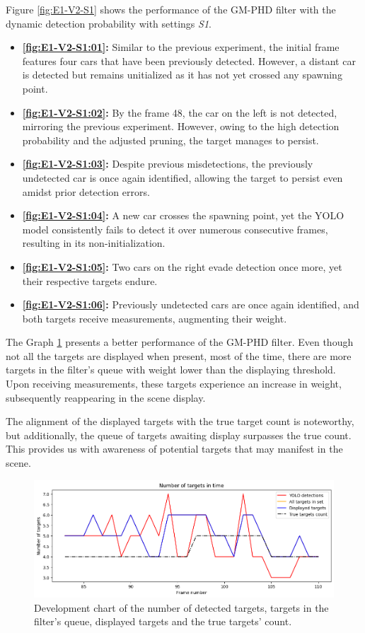 Figure \ref{fig:E1-V2-S1} shows the performance of the GM-PHD filter with the dynamic detection probability with settings \textit{S1}.
\begin{itemize}
    \item \textbf{\ref{fig:E1-V2-S1:01}:} Similar to the previous experiment, the initial frame features four cars
    that have been previously detected. However, a distant car is detected but remains unitialized as it has not yet
    crossed any spawning point.
    \item \textbf{\ref{fig:E1-V2-S1:02}:} By the frame 48, the car on the left is not detected, mirroring the
    previous experiment. However, owing to the high detection probability and the adjusted pruning, the target manages
    to persist.
    \item \textbf{\ref{fig:E1-V2-S1:03}:} Despite previous misdetections, the previously undetected car is once again identified, allowing the target to persist even amidst prior detection errors.
    \item \textbf{\ref{fig:E1-V2-S1:04}:} A new car crosses the spawning point, yet the YOLO model consistently fails to detect it over numerous consecutive frames, resulting in its non-initialization.
    \item \textbf{\ref{fig:E1-V2-S1:05}:} Two cars on the right evade detection once more, yet their respective targets endure.
    \item \textbf{\ref{fig:E1-V2-S1:06}:} Previously undetected cars are once again identified, and both targets receive measurements, augmenting their weight.
\end{itemize}

The Graph \ref{gr:E1-V2-S1} presents a better performance of the GM-PHD filter. Even though not all the targets are
displayed when present, most of the time, there are more targets in the filter's queue with weight lower than the
displaying threshold.
Upon receiving measurements, these targets experience an increase in weight, subsequently reappearing in the scene display.

The alignment of the displayed targets with the true target count is noteworthy, but additionally, the queue of targets awaiting display surpasses the true count. This provides us with awareness of potential targets that may manifest in the scene.

\begin{figure}[H]
    \centering
    \includegraphics[width=\linewidth]{../../../experiments/E1/V2/YOLO/yolo_det}
    \caption{Development chart of the number of detected targets, targets in the filter's queue, displayed targets
    and the
    true targets' count.}
    \label{gr:E1-V2-S1}
\end{figure}

